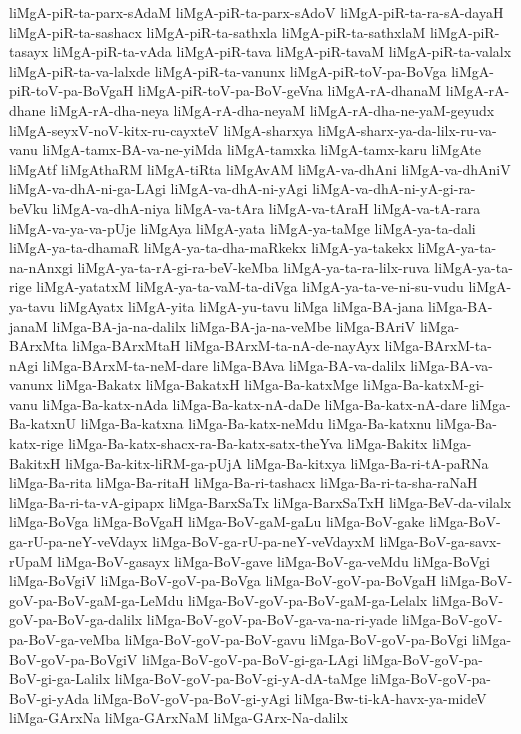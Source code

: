 {liMgA-piR-ta-parx-sAdaM
liMgA-piR-ta-parx-sAdoV
liMgA-piR-ta-ra-sA-dayaH
liMgA-piR-ta-sashacx
liMgA-piR-ta-sathxla
liMgA-piR-ta-sathxlaM
liMgA-piR-tasayx
liMgA-piR-ta-vAda
liMgA-piR-tava
liMgA-piR-tavaM
liMgA-piR-ta-valalx
liMgA-piR-ta-va-lalxde
liMgA-piR-ta-vanunx
liMgA-piR-toV-pa-BoVga
liMgA-piR-toV-pa-BoVgaH
liMgA-piR-toV-pa-BoV-geVna
liMgA-rA-dhanaM
liMgA-rA-dhane
liMgA-rA-dha-neya
liMgA-rA-dha-neyaM
liMgA-rA-dha-ne-yaM-geyudx
liMgA-seyxV-noV-kitx-ru-cayxteV
liMgA-sharxya
liMgA-sharx-ya-da-lilx-ru-va-vanu
liMgA-tamx-BA-va-ne-yiMda
liMgA-tamxka
liMgA-tamx-karu
liMgAte
liMgAtf
liMgAthaRM
liMgA-tiRta
liMgAvAM
liMgA-va-dhAni
liMgA-va-dhAniV
liMgA-va-dhA-ni-ga-LAgi
liMgA-va-dhA-ni-yAgi
liMgA-va-dhA-ni-yA-gi-ra-beVku
liMgA-va-dhA-niya
liMgA-va-tAra
liMgA-va-tAraH
liMgA-va-tA-rara
liMgA-va-ya-va-pUje
liMgAya
liMgA-yata
liMgA-ya-taMge
liMgA-ya-ta-dali
liMgA-ya-ta-dhamaR
liMgA-ya-ta-dha-maRkekx
liMgA-ya-takekx
liMgA-ya-ta-na-nAnxgi
liMgA-ya-ta-rA-gi-ra-beV-keMba
liMgA-ya-ta-ra-lilx-ruva
liMgA-ya-ta-rige
liMgA-yatatxM
liMgA-ya-ta-vaM-ta-diVga
liMgA-ya-ta-ve-ni-su-vudu
liMgA-ya-tavu
liMgAyatx
liMgA-yita
liMgA-yu-tavu
liMga
liMga-BA-jana
liMga-BA-janaM
liMga-BA-ja-na-dalilx
liMga-BA-ja-na-veMbe
liMga-BAriV
liMga-BArxMta
liMga-BArxMtaH
liMga-BArxM-ta-nA-de-nayAyx
liMga-BArxM-ta-nAgi
liMga-BArxM-ta-neM-dare
liMga-BAva
liMga-BA-va-dalilx
liMga-BA-va-vanunx
liMga-Bakatx
liMga-BakatxH
liMga-Ba-katxMge
liMga-Ba-katxM-gi-vanu
liMga-Ba-katx-nAda
liMga-Ba-katx-nA-daDe
liMga-Ba-katx-nA-dare
liMga-Ba-katxnU
liMga-Ba-katxna
liMga-Ba-katx-neMdu
liMga-Ba-katxnu
liMga-Ba-katx-rige
liMga-Ba-katx-shacx-ra-Ba-katx-satx-theYva
liMga-Bakitx
liMga-BakitxH
liMga-Ba-kitx-liRM-ga-pUjA
liMga-Ba-kitxya
liMga-Ba-ri-tA-paRNa
liMga-Ba-rita
liMga-Ba-ritaH
liMga-Ba-ri-tashacx
liMga-Ba-ri-ta-sha-raNaH
liMga-Ba-ri-ta-vA-gipapx
liMga-BarxSaTx
liMga-BarxSaTxH
liMga-BeV-da-vilalx
liMga-BoVga
liMga-BoVgaH
liMga-BoV-gaM-gaLu
liMga-BoV-gake
liMga-BoV-ga-rU-pa-neY-veVdayx
liMga-BoV-ga-rU-pa-neY-veVdayxM
liMga-BoV-ga-savx-rUpaM
liMga-BoV-gasayx
liMga-BoV-gave
liMga-BoV-ga-veMdu
liMga-BoVgi
liMga-BoVgiV
liMga-BoV-goV-pa-BoVga
liMga-BoV-goV-pa-BoVgaH
liMga-BoV-goV-pa-BoV-gaM-ga-LeMdu
liMga-BoV-goV-pa-BoV-gaM-ga-Lelalx
liMga-BoV-goV-pa-BoV-ga-dalilx
liMga-BoV-goV-pa-BoV-ga-va-na-ri-yade
liMga-BoV-goV-pa-BoV-ga-veMba
liMga-BoV-goV-pa-BoV-gavu
liMga-BoV-goV-pa-BoVgi
liMga-BoV-goV-pa-BoVgiV
liMga-BoV-goV-pa-BoV-gi-ga-LAgi
liMga-BoV-goV-pa-BoV-gi-ga-Lalilx
liMga-BoV-goV-pa-BoV-gi-yA-dA-taMge
liMga-BoV-goV-pa-BoV-gi-yAda
liMga-BoV-goV-pa-BoV-gi-yAgi
liMga-Bw-ti-kA-havx-ya-mideV
liMga-GArxNa
liMga-GArxNaM
liMga-GArx-Na-dalilx
}
